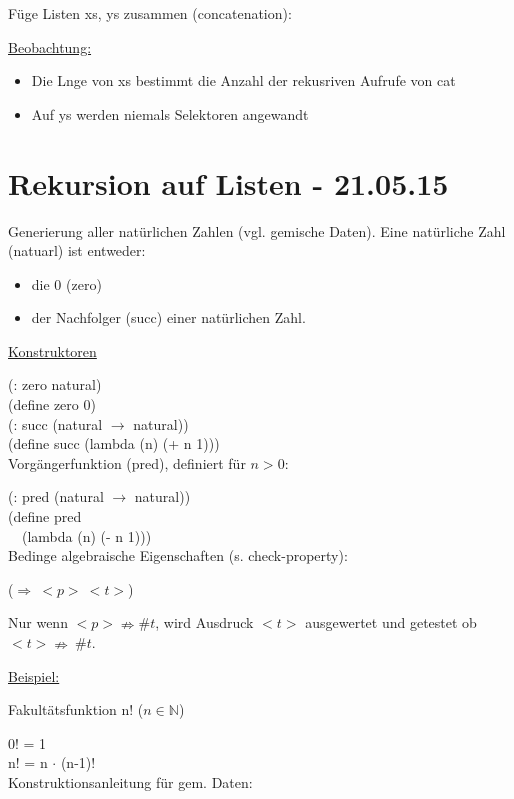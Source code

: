 \documentclass[a4paper, 20pt, openany]{book}
\begin{document}
Füge Listen xs, ys zusammen (concatenation):


\underline{Beobachtung:}

\begin{itemize}
  \item Die Lnge von xs bestimmt die Anzahl der rekusriven Aufrufe von cat
  \item Auf ys werden niemals Selektoren angewandt
\end{itemize}

\chapter{Rekursion auf Listen - 21.05.15}

Generierung aller natürlichen Zahlen (vgl. gemische Daten). Eine natürliche Zahl (natuarl) ist entweder:

\begin{itemize}
  \item die 0 (zero)
  \item der Nachfolger (succ) einer natürlichen Zahl.
\end{itemize}

\underline{Konstruktoren}

(: zero natural) \\
(define zero 0) \\
(: succ (natural $\rightarrow$ natural)) \\
(define succ (lambda (n) (+ n 1))) \\

Vorgängerfunktion (pred), definiert für $n>0$:

(: pred (natural $\rightarrow$ natural)) \\
(define pred \\
\ \ (lambda (n) (- n 1))) \\

Bedinge algebraische Eigenschaften (s. check-property):

($\Rightarrow \ <p> \ <t>$)

Nur wenn $<p> \nRightarrow \#t$, wird Ausdruck $<t>$ ausgewertet und getestet ob $<t> \nRightarrow \ \#t$.

\underline{Beispiel:}

Fakultätsfunktion n! ($n \in \mathbb{N}$)

0! = 1 \\
n! = n $\cdot$ (n-1)! \\

Konstruktionsanleitung für gem. Daten:
\end{document}
